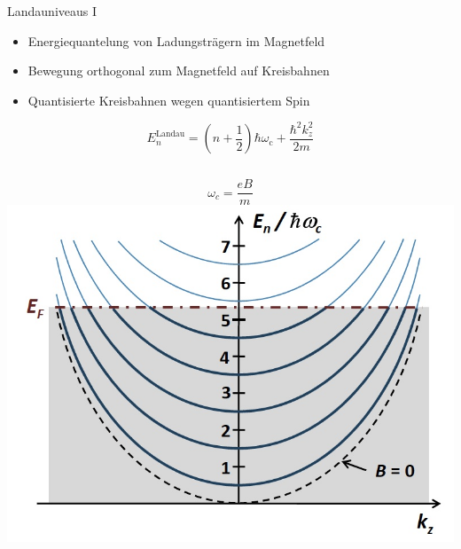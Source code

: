 \documentclass[../defence.tex]{subfiles}
\begin{document}
  \begin{frame}{Landauniveaus I}
    \pause
    \begin{itemize}
      \item Energiequantelung von Ladungsträgern im Magnetfeld
      \pause
      \item Bewegung orthogonal zum Magnetfeld auf Kreisbahnen
      \pause
      \item Quantisierte Kreisbahnen wegen quantisiertem Spin
    \end{itemize}
    \pause
    \begin{equation*}
        E_n^\mathrm{Landau}=\left( n+\frac{1}{2}\right)\hbar\omega_\mathrm{c}+\frac{\hbar^2k_z^2}{2m}
    \end{equation*}
    \pause
    \begin{columns}[onlytextwidth, T]
        \begin{equation*}
          \omega_c = \frac{eB}{m}
        \end{equation*}
        \includegraphics[width=\linewidth]{images/landau_parabeln.png}
        \cite{gross}
    \end{columns}
  \end{frame}
\end{document}
